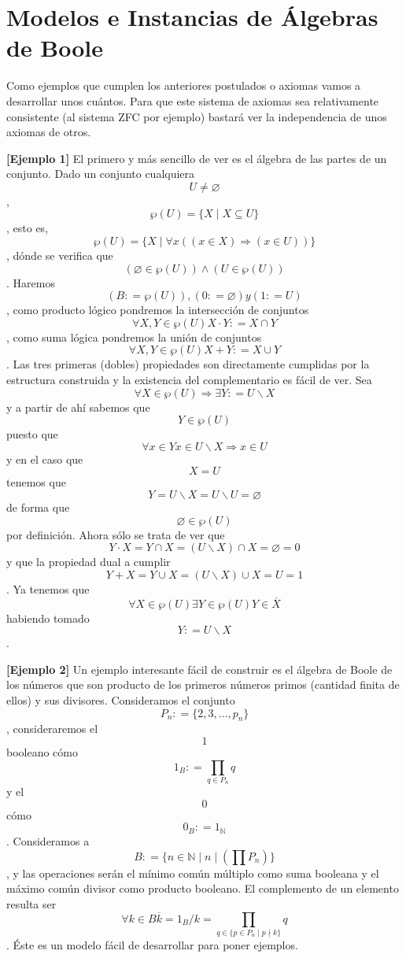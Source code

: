 \chapter{Modelos e Instancias de Álgebras de Boole}

  Como ejemplos que cumplen los anteriores postulados o axiomas vamos a
  desarrollar unos cuántos. Para que este sistema de axiomas sea
  relativamente consistente (al sistema ZFC por ejemplo) bastará ver la
  independencia de unos axiomas de otros.

  \textbf{{[}Ejemplo 1{]}} El primero y más sencillo de ver es el
  álgebra de las partes de un conjunto. Dado un conjunto
  cualquiera\[U \neq \varnothing\],
  \[{\wp(U)} = {\{{X \mid {X \subseteq U}}\}}\], esto es,
  \[{\wp(U)} = {\{{X \mid {{\forall x}\left( {{({x \in X})}\Rightarrow{({x \in U})}} \right)}}\}}\],
  dónde se verifica
  que\[\left( {{\varnothing \in }\wp(U)} \right) \land \left( {{U \in }\wp(U)} \right)\].
  Ha\-remos\[\left( {B{: = }\wp(U)} \right),\left( {0{: = \varnothing}} \right)y\left( {1{: = U}} \right)\],
  como producto lógico pondremos la intersección de
  conjuntos\[\forall X,{Y \in }\wp(U){X \cdot Y}{: = {X \cap Y}}\], como
  suma lógica pondremos la unión de
  conjuntos\[\forall X,{Y \in }\wp(U){X + Y}{: = {X \cup Y}}\]. Las tres
  primeras (dobles) propiedades son di\-rectamente cumplidas por la
  estructura construida y la existencia del complementario es fá\-cil de
  ver. Sea
  \[\forall{X \in }\wp(U)\Rightarrow\exists Y{: = {U \smallsetminus X}}\]y a
  partir de ahí sabemos que\[{Y \in }\wp(U)\]puesto
  que\[\forall{x \in Y}{x \in {U \smallsetminus X}}\Rightarrow{x \in U}\]y
  en el caso que\[X = U\]tenemos que
  \[{{Y = {U \smallsetminus X}} = {U \smallsetminus U}} = \varnothing\]de
  forma que\[{\varnothing \in }\wp(U)\]por definición. Ahora sólo se trata
  de ver
  que\[{{{{Y \cdot X} = {Y \cap X}} = {{({U \smallsetminus X})} \cap X}} = \varnothing} = 0\]y
  que la propiedad dual a
  cumplir\[{{{{Y + X} = {Y \cup X}} = {{({U \smallsetminus X})} \cup X}} = U} = 1\].
  Ya tenemos
  que\[\forall{X \in }\wp(U)\exists{Y \in }\wp(U){Y \in \overline{X}}\]ha\-biendo
  tomado\[Y{: = {U \smallsetminus X}}\].

  \textbf{{[}Ejemplo 2{]}} Un ejemplo interesante fácil de construir es
  el álgebra de Boole de los números que son producto de los primeros
  núme\-ros primos (cantidad finita de ellos) y sus divisores.
  Consideramos el conjunto \[P_{n}{: = {\{{2,3,\ldots,p_{n}}\}}}\],
  con\-sideraremos el \[1\] booleano cómo
  \[1_{B}{: = {\prod\limits_{q \in P_{n}}q}}\]y el \[0\]
  cómo\[0_{B}{: = 1_{\mathbb{N}}}\]. Consideramos a
  \[B{: = {\{{{n \in \mathbb{N}} \mid {n \mid \left( {\prod P_{n}} \right)}}\}}}\],
  y las operaciones serán el mínimo común múltiplo como suma booleana y
  el máximo común divisor como producto booleano. El complemento de un
  ele\-mento resulta ser
  \[\forall{k \in B}{{\overline{k} = {1_{B}/k}} = {\prod\limits_{q \in {\{{{{p \in P_{n}} \mid p} \nmid k}\}}}q}}\].
  Éste es un modelo fácil de desarrollar para poner ejemplos.

